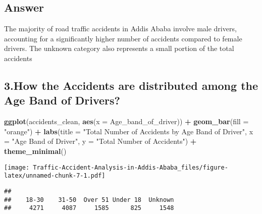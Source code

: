 \documentclass[
]{article}
\newenvironment{Shaded}{\begin{snugshade}}{\end{snugshade}}
\newcommand{\AttributeTok}[1]{\textcolor[rgb]{0.13,0.29,0.53}{#1}}
\newcommand{\CommentTok}[1]{\textcolor[rgb]{0.56,0.35,0.01}{\textit{#1}}}
\newcommand{\FunctionTok}[1]{\textcolor[rgb]{0.13,0.29,0.53}{\textbf{#1}}}
\newcommand{\NormalTok}[1]{#1}
\newcommand{\SpecialCharTok}[1]{\textcolor[rgb]{0.81,0.36,0.00}{\textbf{#1}}}
\newcommand{\StringTok}[1]{\textcolor[rgb]{0.31,0.60,0.02}{#1}}
\begin{document}
\hypertarget{answer}{%
\subsection{Answer}\label{answer}}

The majority of road traffic accidents in Addis Ababa involve male
drivers, accounting for a significantly higher number of accidents
compared to female drivers. The unknown category also represents a small
portion of the total accidents

\hypertarget{how-the-accidents-are-distributed-among-the-age-band-of-drivers}{%
\subsection{3.How the Accidents are distributed among the Age Band of
Drivers?}\label{how-the-accidents-are-distributed-among-the-age-band-of-drivers}}

\begin{Shaded}
\begin{Highlighting}[]
\FunctionTok{ggplot}\NormalTok{(accidents\_clean, }\FunctionTok{aes}\NormalTok{(}\AttributeTok{x =}\NormalTok{ Age\_band\_of\_driver)) }\SpecialCharTok{+}
  \FunctionTok{geom\_bar}\NormalTok{(}\AttributeTok{fill =} \StringTok{"orange"}\NormalTok{) }\SpecialCharTok{+}
  \FunctionTok{labs}\NormalTok{(}\AttributeTok{title =} \StringTok{"Total Number of Accidents by Age Band of Driver"}\NormalTok{, }\AttributeTok{x =} \StringTok{"Age Band of Driver"}\NormalTok{, }\AttributeTok{y =} \StringTok{"Total Number of Accidents"}\NormalTok{) }\SpecialCharTok{+}
  \FunctionTok{theme\_minimal}\NormalTok{()}
\end{Highlighting}
\end{Shaded}

\texttt{[image: Traffic-Accident-Analysis-in-Addis-Ababa\_files/figure-latex/unnamed-chunk-7-1.pdf]}

\begin{Shaded}
\end{Shaded}

\begin{verbatim}
## 
##    18-30    31-50  Over 51 Under 18  Unknown 
##     4271     4087     1585      825     1548
\end{verbatim}
\end{document}
